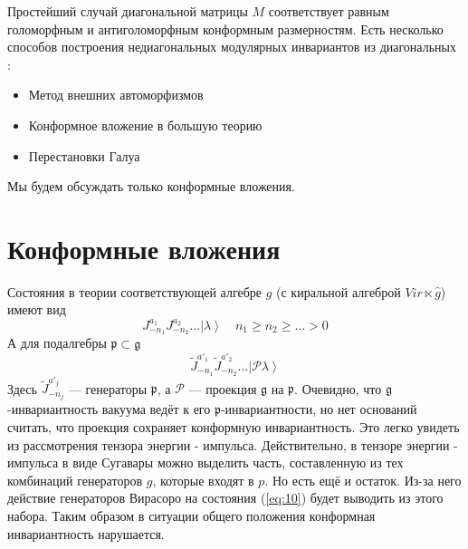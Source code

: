 \documentclass[a4paper,12pt]{article}
\theoremstyle{definition} \newtheorem{Def}{Definition}
\begin{document}
Простейший случай диагональной матрицы $M$ соответствует равным голоморфным и антиголоморфным конформным размерностям. Есть несколько способов построения недиагональных модулярных инвариантов из диагональных \cite{difrancesco1997cft}:
\begin{itemize}
\item Метод внешних автоморфизмов
\item Конформное вложение в большую теорию
\item Перестановки Галуа
\end{itemize}
Мы будем обсуждать только конформные вложения.

\section{Конформные вложения}
\label{sec:conformal-embeddings}

Состояния в теории соответствующей алгебре $g$ (с киральной алгеброй $Vir\ltimes \hat g$) имеют вид
\begin{equation}
  \label{eq:9}
  J^{a_1}_{-n_1}J^{a_2}_{-n_2}\dots\left|\lambda\right>\quad n_1\geq n_2\geq\dots>0
\end{equation}
А для подалгебры $\mathfrak{p}\subset\mathfrak{g}$
\begin{equation}
  \label{eq:10}
  \tilde{J}^{a'_1}_{-n_1}\tilde{J}^{a'_2}_{-n_2}\dots\left|\mathcal{P}\lambda\right>
\end{equation}
Здесь $\tilde{J}^{a'_j}_{-n_j}$ --- генераторы $\mathfrak{p}$, а $\mathcal{P}$ --- проекция $\mathfrak{g}$ на $\mathfrak{p}$. Очевидно, что $\mathfrak{g}$-инвариантность вакуума ведёт к его $\mathfrak{p}$-инвариантности, но нет оснований считать, что проекция сохраняет конформную инвариантность. Это легко увидеть из рассмотрения тензора энергии - импульса. Действительно, в тензоре энергии - импульса в виде Сугавары можно выделить часть, составленную из тех комбинаций генераторов $g$, которые входят в $p$. Но есть ещё и остаток. Из-за него действие генераторов Вирасоро на состояния (\ref{eq:10}) будет выводить из этого набора.
Таким образом в ситуации общего положения конформная инвариантность нарушается.
\end{document}
